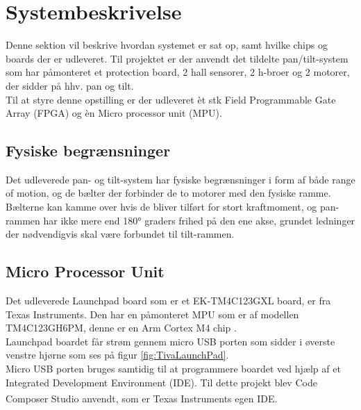 \section{Systembeskrivelse}
Denne sektion vil beskrive hvordan systemet er sat op, samt hvilke chips og boards der er udleveret.
Til projektet er der anvendt det tildelte pan/tilt-system som har påmonteret et protection board, 2 hall sensorer, 2 h-broer og 2 motorer, der sidder på hhv. pan og tilt.\\
Til at styre denne opstilling er der udleveret èt stk Field Programmable Gate Array (FPGA) og èn Micro processor unit (MPU).
\\

\subsection{Fysiske begrænsninger}

Det udleverede pan- og tilt-system har fysiske begrænsninger i form af både range of motion, og de bælter der forbinder de to motorer med den fysiske ramme. Bælterne kan kamme over hvis de bliver tilført for stort kraftmoment, og pan-rammen har ikke mere end 180° graders frihed på den ene akse, grundet ledninger der nødvendigvis skal være forbundet til tilt-rammen.

\subsection{Micro Processor Unit}
Det udleverede Launchpad board som er et EK-TM4C123GXL board, er fra Texas Instruments. Den har en påmonteret MPU som er af modellen TM4C123GH6PM, denne er en Arm Cortex M4 chip \cite{TM4C123GH6PMDatasheet}.\\
Launchpad boardet får strøm gennem micro USB porten som sidder i øverste venstre hjørne som ses på figur \ref{fig:TivaLaunchPad}.\\
Micro USB porten bruges samtidig til at programmere boardet ved hjælp af et Integrated Development Environment (IDE). Til dette projekt blev Code Composer Studio \textsuperscript{\texttrademark} anvendt, som er Texas Instruments egen IDE.

